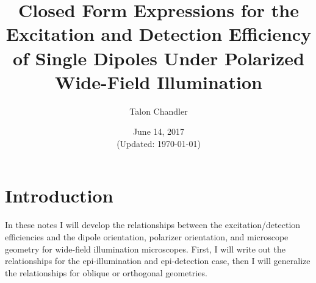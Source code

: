 \documentclass[11pt]{article}
\begin{document}
\title{\vspace{-2.5em} Closed Form Expressions for the Excitation and Detection Efficiency of Single Dipoles Under Polarized Wide-Field Illumination \vspace{-1em}}
\author{Talon Chandler}%
\date{\vspace{-1em}June 14, 2017\\ (Updated: \today)\vspace{-1em}}
\maketitle
\section{Introduction}
In these notes I will develop the relationships between the excitation/detection
efficiencies and the dipole orientation, polarizer orientation, and microscope
geometry for wide-field illumination microscopes. First, I will write out the
relationships for the epi-illumination and epi-detection case, then I will
generalize the relationships for oblique or orthogonal geometries. 
\end{document}
